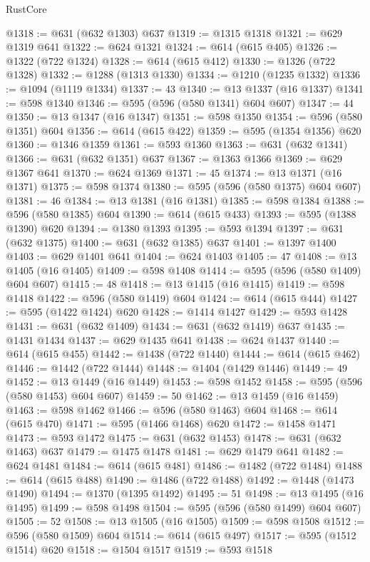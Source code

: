 \begin{lexlean}{RustCore}
\begin{coremodule}
@1318 := @631 (@632 @1303) @637
@1319 := @1315 @1318
@1321 := @629 @1319 @641
@1322 := @624 @1321
@1324 := @614 (@615 @405)
@1326 := @1322 (@722 @1324)
@1328 := @614 (@615 @412)
@1330 := @1326 (@722 @1328)
@1332 := @1288 (@1313 @1330)
@1334 := @1210 (@1235 @1332)
@1336 := @1094 (@1119 @1334)
@1337 := 43
@1340 := @13 @1337 (@16 @1337)
@1341 := @598 @1340
@1346 := @595 (@596 (@580 @1341) @604 @607)
@1347 := 44
@1350 := @13 @1347 (@16 @1347)
@1351 := @598 @1350
@1354 := @596 (@580 @1351) @604
@1356 := @614 (@615 @422)
@1359 := @595 (@1354 @1356) @620
@1360 := @1346 @1359
@1361 := @593 @1360
@1363 := @631 (@632 @1341)
@1366 := @631 (@632 @1351) @637
@1367 := @1363 @1366
@1369 := @629 @1367 @641
@1370 := @624 @1369
@1371 := 45
@1374 := @13 @1371 (@16 @1371)
@1375 := @598 @1374
@1380 := @595 (@596 (@580 @1375) @604 @607)
@1381 := 46
@1384 := @13 @1381 (@16 @1381)
@1385 := @598 @1384
@1388 := @596 (@580 @1385) @604
@1390 := @614 (@615 @433)
@1393 := @595 (@1388 @1390) @620
@1394 := @1380 @1393
@1395 := @593 @1394
@1397 := @631 (@632 @1375)
@1400 := @631 (@632 @1385) @637
@1401 := @1397 @1400
@1403 := @629 @1401 @641
@1404 := @624 @1403
@1405 := 47
@1408 := @13 @1405 (@16 @1405)
@1409 := @598 @1408
@1414 := @595 (@596 (@580 @1409) @604 @607)
@1415 := 48
@1418 := @13 @1415 (@16 @1415)
@1419 := @598 @1418
@1422 := @596 (@580 @1419) @604
@1424 := @614 (@615 @444)
@1427 := @595 (@1422 @1424) @620
@1428 := @1414 @1427
@1429 := @593 @1428
@1431 := @631 (@632 @1409)
@1434 := @631 (@632 @1419) @637
@1435 := @1431 @1434
@1437 := @629 @1435 @641
@1438 := @624 @1437
@1440 := @614 (@615 @455)
@1442 := @1438 (@722 @1440)
@1444 := @614 (@615 @462)
@1446 := @1442 (@722 @1444)
@1448 := @1404 (@1429 @1446)
@1449 := 49
@1452 := @13 @1449 (@16 @1449)
@1453 := @598 @1452
@1458 := @595 (@596 (@580 @1453) @604 @607)
@1459 := 50
@1462 := @13 @1459 (@16 @1459)
@1463 := @598 @1462
@1466 := @596 (@580 @1463) @604
@1468 := @614 (@615 @470)
@1471 := @595 (@1466 @1468) @620
@1472 := @1458 @1471
@1473 := @593 @1472
@1475 := @631 (@632 @1453)
@1478 := @631 (@632 @1463) @637
@1479 := @1475 @1478
@1481 := @629 @1479 @641
@1482 := @624 @1481
@1484 := @614 (@615 @481)
@1486 := @1482 (@722 @1484)
@1488 := @614 (@615 @488)
@1490 := @1486 (@722 @1488)
@1492 := @1448 (@1473 @1490)
@1494 := @1370 (@1395 @1492)
@1495 := 51
@1498 := @13 @1495 (@16 @1495)
@1499 := @598 @1498
@1504 := @595 (@596 (@580 @1499) @604 @607)
@1505 := 52
@1508 := @13 @1505 (@16 @1505)
@1509 := @598 @1508
@1512 := @596 (@580 @1509) @604
@1514 := @614 (@615 @497)
@1517 := @595 (@1512 @1514) @620
@1518 := @1504 @1517
@1519 := @593 @1518

\end{coremodule}
\end{lexlean}
